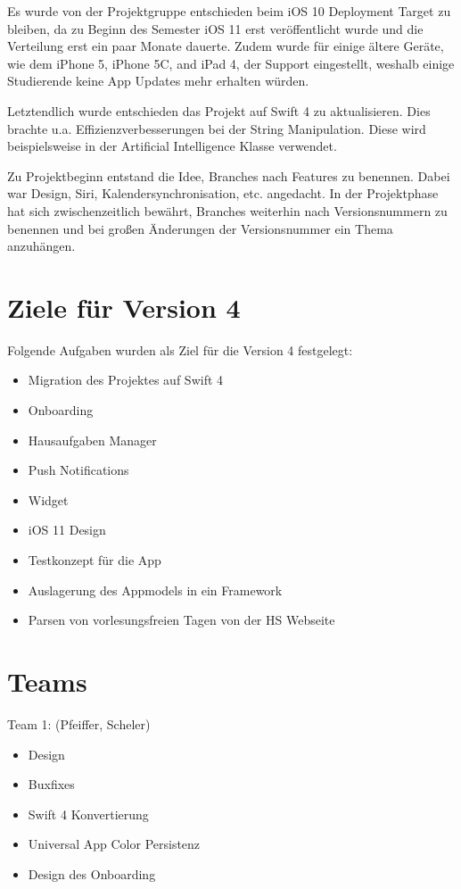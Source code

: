 Es wurde von der Projektgruppe entschieden beim iOS 10 Deployment Target zu bleiben, da zu Beginn des Semester iOS 11 erst veröffentlicht wurde und die Verteilung erst ein paar Monate dauerte. Zudem wurde für einige ältere Geräte, wie dem iPhone 5, iPhone 5C, and iPad 4, der Support eingestellt, weshalb einige Studierende keine App Updates mehr erhalten würden.

Letztendlich wurde entschieden das Projekt auf Swift 4 zu aktualisieren. Dies brachte u.a. Effizienzverbesserungen bei der String Manipulation. Diese wird beispielsweise in der Artificial Intelligence Klasse verwendet.

Zu Projektbeginn entstand die Idee, Branches nach Features zu benennen. Dabei war Design, Siri, Kalendersynchronisation, etc. angedacht. In der Projektphase hat sich zwischenzeitlich bewährt, Branches weiterhin nach Versionsnummern zu benennen und bei großen Änderungen der Versionsnummer ein Thema anzuhängen.


\section{Ziele für Version 4}
Folgende Aufgaben wurden als Ziel für die Version 4 festgelegt:
\begin{itemize}
\item Migration des Projektes auf Swift 4
\item Onboarding
\item Hausaufgaben Manager
\item Push Notifications
\item Widget
\item iOS 11 Design
\item Testkonzept für die App
\item Auslagerung des Appmodels in ein Framework
\item Parsen von vorlesungsfreien Tagen von der HS Webseite
\end{itemize}


\section{Teams}

Team 1: (Pfeiffer, Scheler)
\begin{itemize}
\item Design
\item Buxfixes
\item Swift 4 Konvertierung
\item Universal App Color Persistenz
\item Design des Onboarding
\end{itemize}


